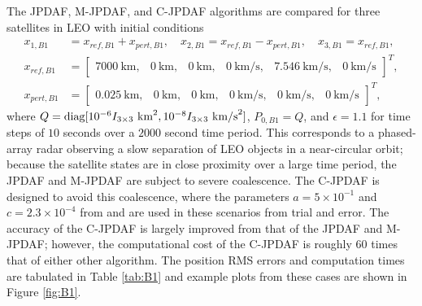 The JPDAF, M-JPDAF, and C-JPDAF algorithms are compared for three satellites in LEO with initial conditions
\begin{align}
x_{1,B1}&=x_{ref,B1}+x_{pert,B1}, \quad x_{2,B1}=x_{ref,B1}-x_{pert,B1}, \quad x_{3,B1}=x_{ref,B1},\nonumber
\\
x_{ref,B1}&=\begin{bmatrix}7000\ \text{km}, & 0\ \text{km}, & 0\ \text{km}, & 0\ \text{km/s}, & 7.546\ \text{km/s}, & 0\ \text{km/s}\end{bmatrix}^T,
\nonumber\\
x_{pert,B1}&=\begin{bmatrix}
0.025\ \text{km}, & 0\ \text{km}, & 0\ \text{km}, & 0\ \text{km/s}, & 0\ \text{km/s}, & 0\ \text{km/s}
\end{bmatrix}^T,\nonumber
\end{align}
where $Q=\mathop{\mathrm{diag}}\nolimits[10^{-6}I_{3\times3}\ \text{km}^2, 10^{-8}I_{3\times3}\ \text{km/s}^2]$, $P_{0,B1}=Q$, and $\epsilon=1.1$ for time steps of $10$ seconds over a $2000$ second time period.
This corresponds to a phased-array radar observing a slow separation of LEO objects in a near-circular orbit; because the satellite states are in close proximity over a large time period, the JPDAF and M-JPDAF are subject to severe coalescence.
The C-JPDAF is designed to avoid this coalescence, where the parameters $a=5\times10^{-1}$ and $c=2.3\times10^{-4}$ from  and  are used in these scenarios from trial and error.
The accuracy of the C-JPDAF is largely improved from that of the JPDAF and M-JPDAF; however, the computational cost of the C-JPDAF is roughly $60$ times that of either other algorithm.
The position RMS errors and computation times are tabulated in Table \ref{tab:B1} and example plots from these cases are shown in Figure \ref{fig:B1}.

